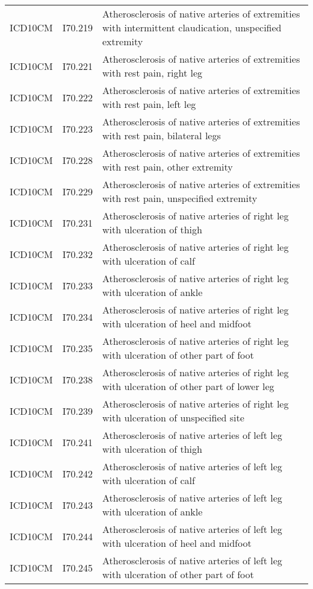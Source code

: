 \begin{longtable}{p{}p{}p{}}
  ICD10CM & I70.219 & Atherosclerosis of native arteries of extremities with intermittent claudication, unspecified extremity \\ 
  ICD10CM & I70.221 & Atherosclerosis of native arteries of extremities with rest pain, right leg \\ 
  ICD10CM & I70.222 & Atherosclerosis of native arteries of extremities with rest pain, left leg \\ 
  ICD10CM & I70.223 & Atherosclerosis of native arteries of extremities with rest pain, bilateral legs \\ 
  ICD10CM & I70.228 & Atherosclerosis of native arteries of extremities with rest pain, other extremity \\ 
  ICD10CM & I70.229 & Atherosclerosis of native arteries of extremities with rest pain, unspecified extremity \\ 
  ICD10CM & I70.231 & Atherosclerosis of native arteries of right leg with ulceration of thigh \\ 
  ICD10CM & I70.232 & Atherosclerosis of native arteries of right leg with ulceration of calf \\ 
  ICD10CM & I70.233 & Atherosclerosis of native arteries of right leg with ulceration of ankle \\ 
  ICD10CM & I70.234 & Atherosclerosis of native arteries of right leg with ulceration of heel and midfoot \\ 
  ICD10CM & I70.235 & Atherosclerosis of native arteries of right leg with ulceration of other part of foot \\ 
  ICD10CM & I70.238 & Atherosclerosis of native arteries of right leg with ulceration of other part of lower leg \\ 
  ICD10CM & I70.239 & Atherosclerosis of native arteries of right leg with ulceration of unspecified site \\ 
  ICD10CM & I70.241 & Atherosclerosis of native arteries of left leg with ulceration of thigh \\ 
  ICD10CM & I70.242 & Atherosclerosis of native arteries of left leg with ulceration of calf \\ 
  ICD10CM & I70.243 & Atherosclerosis of native arteries of left leg with ulceration of ankle \\ 
  ICD10CM & I70.244 & Atherosclerosis of native arteries of left leg with ulceration of heel and midfoot \\ 
  ICD10CM & I70.245 & Atherosclerosis of native arteries of left leg with ulceration of other part of foot \\ 

\end{longtable}

